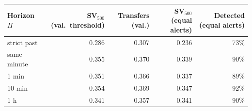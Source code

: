 \begin{tabular}{lrrrr}
\toprule
Horizon $H$ & SV$_{500}$ (val.\ threshold) & Transfers (val.) & SV$_{500}$ (equal alerts) & Detected (equal alerts) \\
\midrule
strict past & 0.286 & 0.307 & 0.236 & 73\% \\
same minute & 0.355 & 0.370 & 0.339 & 90\% \\
1 min & 0.351 & 0.366 & 0.337 & 89\% \\
10 min & 0.354 & 0.369 & 0.347 & 92\% \\
1 h & 0.341 & 0.357 & 0.341 & 90\% \\
\bottomrule
\end{tabular}